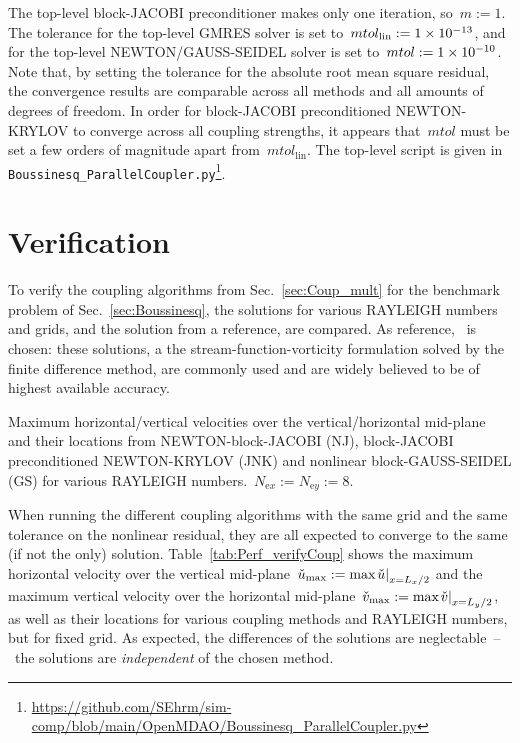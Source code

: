 \documentclass[10pt, ngerman, english,
twoside, open=right,
numbers=noenddot,
declaration=section,
abstract=section,
abstract=multiple,
abstract=notoc,
declaration=notoc,
cd=pale, 
chapterprefix=off, 
chapterpage=false, 
headingsvskip=-10em,
cdgeometry=custom, 
slantedgreek=on,
cdmath=on, 
cdfont=on,
ttfont=false,
mathswap=off,
]{tudscrreprt}
\numberwithin{equation}{chapter}
\renewcommand{\textsc}[1]{\uppercase{\mbox{#1}}}
\newcommand{\sidenote}[1]{
  \leavevmode %
  \marginpar{\hyphenpenalty=1000 \flushleft{\textcolor{HKS41}{#1}}}}
\begin{document}
The top-level block-\textsc{Jacobi} preconditioner makes only one iteration, so~$m:=\num{1}$.
The tolerance for the top-level GMRES solver is set to~$mtol_\text{lin}:=\num{1e-13}$, and for the top-level \textsc{Newton}/\textsc{Gau\ss}-\textsc{Seidel} solver is set to~$mtol:=\num{1e-10}$. Note that, by setting the tolerance for the absolute root mean square residual, the convergence results are comparable across all methods and all amounts of degrees of freedom. In order for block-\textsc{Jacobi} preconditioned \textsc{Newton}-\textsc{Krylov} to converge across all coupling strengths, it appears that~$mtol$ must be set a few orders of magnitude apart from~$mtol_\text{lin}$. The top-level script is given in \texttt{Boussinesq\_ParallelCoupler.py}\footnote{\url{https://github.com/SEhrm/sim-comp/blob/main/OpenMDAO/Boussinesq_ParallelCoupler.py}}.
\section{Verification}\label{sec:Perf_verify}
\sidenote{Reference}To verify the coupling algorithms from Sec.~\ref{sec:Coup_mult} for the benchmark problem of Sec.~\ref{sec:Boussinesq}, the solutions for various \textsc{Rayleigh} numbers and grids, and the solution from a reference, are compared. As reference,~\cite{DeVahl} is chosen: these solutions, a the stream-function-vorticity formulation solved by the finite difference method, are commonly used and are widely believed to be of highest available accuracy.\par
\begin{table}[!b]
\centering
\caption{Maximum horizontal/vertical velocities over the vertical/horizontal mid-plane and their locations from \textsc{Newton}-block-\textsc{Jacobi} (NJ), block-\textsc{Jacobi} preconditioned \textsc{Newton}-\textsc{Krylov} (JNK) and nonlinear block-\textsc{Gau\ss}-\textsc{Seidel} (GS) for various \textsc{Rayleigh} numbers.~$N_{\text{e}x}:=N_{\text{e}y}:=\num{8}$.}\label{tab:Perf_verifyCoup}
\vspace{0.5em}
\def\arraystretch{0.9}

\end{table}
\sidenote{Equivalence}When running the different coupling algorithms with the same grid and the same tolerance on the nonlinear residual, they are all expected to converge to the same (if not the only) solution.
Table~\ref{tab:Perf_verifyCoup} shows the maximum horizontal velocity over the vertical mid-plane~$\check{u}_\text{max} := \max \at{\check{u}}{x=L_x/2}$ and the maximum vertical velocity over the horizontal mid-plane~$\check{v}_\text{max} := \max \at{\check{v}}{x=L_y/2}$, as well as their locations for various coupling methods and \textsc{Rayleigh} numbers, but for fixed grid. As expected, the differences of the solutions are neglectable~--~the solutions are \emph{independent} of the chosen method.\par
\end{document}
